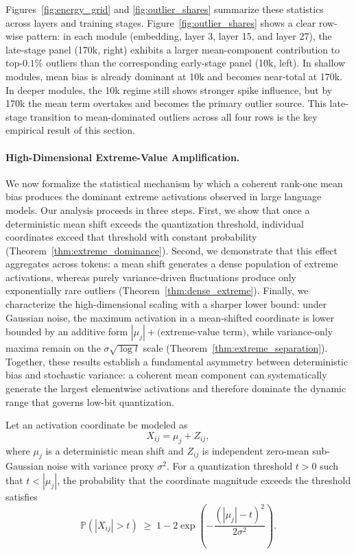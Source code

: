 Figures~\ref{fig:energy_grid} and \ref{fig:outlier_shares} summarize these statistics across layers and training stages. Figure~\ref{fig:outlier_shares} shows a clear row-wise pattern: in each module (embedding, layer 3, layer 15, and layer 27), the late-stage panel (170k, right) exhibits a larger mean-component contribution to top-$0.1\%$ outliers than the corresponding early-stage panel (10k, left). In shallow modules, mean bias is already dominant at 10k and becomes near-total at 170k. In deeper modules, the 10k regime still shows stronger spike influence, but by 170k the mean term overtakes and becomes the primary outlier source. This late-stage transition to mean-dominated outliers across all four rows is the key empirical result of this section.

\paragraph{High-Dimensional Extreme-Value Amplification.}
We now formalize the statistical mechanism by which a coherent rank-one mean bias produces the dominant extreme activations observed in large language models. Our analysis proceeds in three steps. First, we show that once a deterministic mean shift exceeds the quantization threshold, individual coordinates exceed that threshold with constant probability (Theorem~\ref{thm:extreme_dominance}). Second, we demonstrate that this effect aggregates across tokens: a mean shift generates a dense population of extreme activations, whereas purely variance-driven fluctuations produce only exponentially rare outliers (Theorem~\ref{thm:dense_extreme}). Finally, we characterize the high-dimensional scaling with a sharper lower bound: under Gaussian noise, the maximum activation in a mean-shifted coordinate is lower bounded by an additive form $|\mu_j|+\text{(extreme-value term)}$, while variance-only maxima remain on the $\sigma\sqrt{\log l}$ scale (Theorem~\ref{thm:extreme_separation}). Together, these results establish a fundamental asymmetry between deterministic bias and stochastic variance: a coherent mean component can systematically generate the largest elementwise activations and therefore dominate the dynamic range that governs low-bit quantization.

\begin{theorem}
\label{thm:extreme_dominance}
Let an activation coordinate be modeled as
\[
X_{ij} = \mu_j + Z_{ij},
\]
where $\mu_j$ is a deterministic mean shift and $Z_{ij}$ is independent zero-mean sub-Gaussian noise with variance proxy $\sigma^2$. For a quantization threshold $t>0$ such that $t < |\mu_j|$, the probability that the coordinate magnitude exceeds the threshold satisfies
\begin{equation}
\mathbb{P}(|X_{ij}| > t)
\;\ge\;
1 - 2\exp\!\left(-\frac{(|\mu_j| - t)^2}{2\sigma^2}\right).
\end{equation}
\end{theorem}

